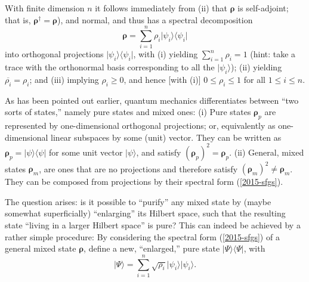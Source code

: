 With finite dimension $n$ it follows immediately from (ii)
that $\boldsymbol{\rho}$ is self-adjoint; that is,
${\boldsymbol{\rho}}^\dagger ={\boldsymbol{\rho}}$), and normal, and thus has a spectral decomposition
\begin{equation}
\boldsymbol{\rho} =\sum_{i=1}^n \rho_i \vert \psi_i\rangle \langle \psi_i \vert
\label{2015-sfgs}
\end{equation}
into orthogonal projections $\vert \psi_i\rangle \langle \psi_i \vert$,
with
(i) yielding $\sum_{i=1}^n\rho_i =1$
(hint: take a trace with the orthonormal basis corresponding to all the $\vert \psi_i\rangle$);
(ii) yielding  $\overline{\rho_i}=\rho_i$;
and (iii) implying $\rho_i \ge 0$, and hence [with (i)] $0 \le \rho_i \le 1$
for all $1\le i \le n$.


As has been pointed out earlier, quantum mechanics differentiates between ``two sorts of states,'' namely
pure states and mixed ones:
 (i)
Pure states ${\boldsymbol{\rho}}_p$  are
represented by one-dimensional orthogonal projections; or, equivalently as one-dimensional linear subspaces by some (unit) vector.
They can be written as ${\boldsymbol{\rho}}_p =  \vert \psi \rangle \langle \psi  \vert$ for some unit vector $\vert \psi \rangle$,
and satisfy $({\boldsymbol{\rho}}_p)^2={\boldsymbol{\rho}}_p$.
 (ii)
General, mixed states ${\boldsymbol{\rho}}_m$, are ones that are no projections and therefore
satisfy $({\boldsymbol{\rho}}_m)^2 \neq {\boldsymbol{\rho}}_m$.
They can be composed from projections by their spectral form (\ref{2015-sfgs}).



The question arises: is it possible to ``purify'' any mixed state by (maybe somewhat superficially) ``enlarging'' its
Hilbert space, such that the resulting state ``living in a larger Hilbert space'' is pure?
This can indeed be achieved by a rather simple procedure:
By considering the spectral form (\ref{2015-sfgs}) of a general mixed state ${\boldsymbol{\rho}}$,
define a new, ``enlarged,'' pure state  $\vert \Psi\rangle \langle \Psi \vert$, with
\begin{equation}
\vert \Psi\rangle = \sum_{i=1}^n \sqrt{\rho_i}  \vert \psi_i\rangle  \vert \psi_i\rangle
.
\label{2015-puran}
\end{equation}


